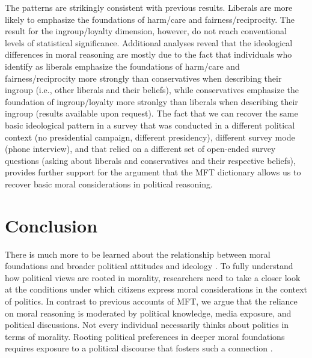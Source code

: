 \documentclass[12pt]{article}
\begin{document}
The patterns are strikingly consistent with previous results. Liberals are more likely to emphasize the foundations of harm/care and fairness/reciprocity. The result for the ingroup/loyalty dimension, however, do not reach conventional levels of statistical significance. Additional analyses reveal that the ideological differences in moral reasoning are mostly due to the fact that individuals who identify as liberals emphasize the foundations of harm/care and fairness/reciprocity more strongly than conservatives when describing their ingroup (i.e., other liberals and their beliefs), while conservatives emphasize the foundation of ingroup/loyalty more stronlgy than liberals when describing their ingroup (results available upon request). The fact that we can recover the same basic ideological pattern in a survey that was conducted in a different political context (no presidential campaign, different presidency), different survey mode (phone interview), and that relied on a different set of open-ended survey questions (asking about liberals and conservatives and their respective beliefs), provides further support for the argument that the MFT dictionary allows us to recover basic moral considerations in political reasoning.


\section*{Conclusion}

There is much more to be learned about the relationship between moral foundations and broader political attitudes and ideology \citep[e.g.,][]{feldman2013political}. To fully understand how political views are rooted in morality, researchers need to take a closer look at the conditions under which citizens express moral considerations in the context of politics. In contrast to previous accounts of MFT, we argue that the reliance on moral reasoning is moderated by political knowledge, media exposure, and political discussions. Not every individual necessarily thinks about politics in terms of morality. Rooting political preferences in deeper moral foundations requires exposure to a political discourse that fosters such a connection \citep[c.f.,][]{clifford2015concerns}.
\end{document}
